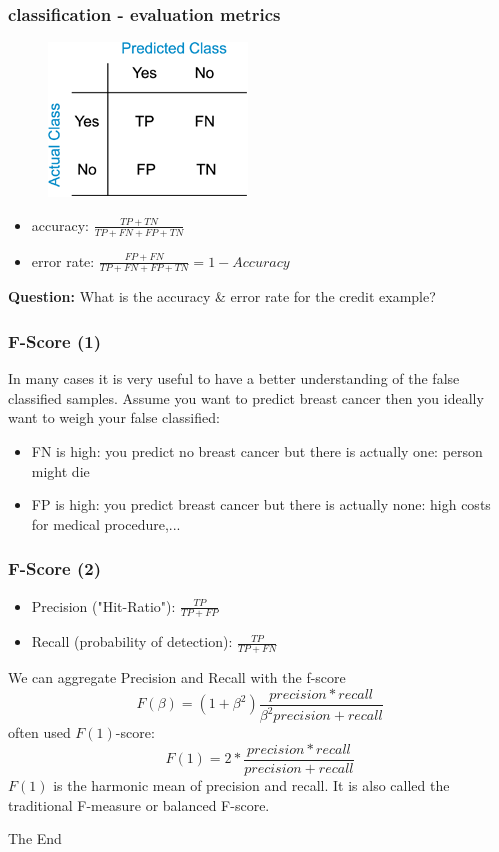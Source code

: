 \documentclass{beamer}
\begin{document}
\begin{frame}
\frametitle{classification - evaluation metrics}
\begin{figure}
\includegraphics[width = 0.4\linewidth]{figures/03/Binary_confusion_matrix.png}
\end{figure}
\begin{itemize}
\item accuracy: $\frac{TP + TN}{TP +FN +FP + TN}$
\item error rate: $\frac{FP + FN}{TP +FN +FP + TN} = 1- Accuracy$
\end{itemize}
\bigskip
\textbf{Question:} What is the accuracy \& error rate for the credit example? 
\end{frame}

\begin{frame}
\frametitle{F-Score (1) }
In many cases it is very useful to have a better understanding of the false classified samples.
\newline
Assume you want to predict breast cancer then you ideally want to weigh your false classified: 
\begin{itemize}
\item FN is high: you predict no breast cancer but there is actually one: person might die
\item FP is high: you predict breast cancer but there is actually none: high costs for medical procedure,...
\end{itemize}
\end{frame}

\begin{frame}
\frametitle{F-Score (2)}
\begin{itemize}
\item Precision ("Hit-Ratio"): $\frac{TP}{TP + FP}$
\item Recall (probability of detection): $\frac{TP}{TP + FN}$
\end{itemize}
We can aggregate Precision and Recall with the f-score
\newline
\begin{equation*}
F(\beta) = (1 + \beta^2) \frac{ precision * recall}{\beta^2 precision + recall}
\end{equation*}
often used $F(1)$-score:
\begin{equation*}
F(1) = 2* \frac{precision * recall}{precision + recall}
\end{equation*}
$F(1)$ is the harmonic mean of precision and recall. It is also called the traditional F-measure or balanced F-score.
\end{frame}


\begin{frame}
\Huge{\centerline{The End}}
\end{frame}

\end{document}
